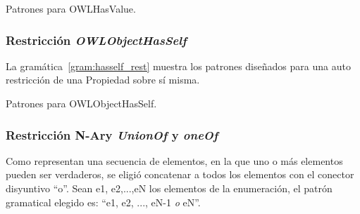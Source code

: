 \begin{GrammarEnv}
\begin{grammar}
\end{grammar}
\caption{Patrones para OWLHasValue.}\label{gram:hasvalue_rest}
\end{GrammarEnv}

\subsubsection{Restricción \emph{OWLObjectHasSelf}}
La gramática~\ref{gram:hasself_rest} muestra los patrones diseñados para una auto restricción de una Propiedad sobre sí misma.

\begin{GrammarEnv}
\begin{grammar}
\end{grammar}
\caption{Patrones para OWLObjectHasSelf.}\label{gram:hasself_rest}
\end{GrammarEnv}


\subsubsection{Restricción N-Ary \emph{UnionOf} y \emph{oneOf}} 
Como representan una secuencia de elementos, en la que uno o más elementos pueden ser verdaderos, se eligió concatenar a todos los elementos con el conector disyuntivo ``o''. Sean e1, e2,...,eN los elementos de la enumeración, el patrón gramatical elegido es: ``e1, e2, ..., eN-1 \emph{o} eN''.

